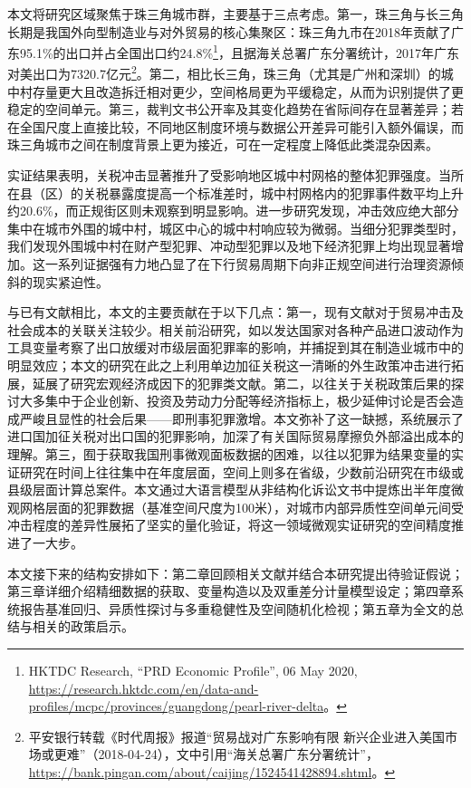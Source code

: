 \documentclass[a4paper,12pt]{report}
\begin{document}
本文将研究区域聚焦于珠三角城市群，主要基于三点考虑。第一，珠三角与长三角长期是我国外向型制造业与对外贸易的核心集聚区：珠三角九市在2018年贡献了广东95.1\%的出口并占全国出口约24.8\%\footnote{HKTDC Research, ``PRD Economic Profile'', 06 May 2020, \url{https://research.hktdc.com/en/data-and-profiles/mcpc/provinces/guangdong/pearl-river-delta}。}，且据海关总署广东分署统计，2017年广东对美出口为7320.7亿元\footnote{平安银行转载《时代周报》报道“贸易战对广东影响有限 新兴企业进入美国市场或更难”（2018-04-24），文中引用“海关总署广东分署统计”，\url{https://bank.pingan.com/about/caijing/1524541428894.shtml}。}。第二，相比长三角，珠三角（尤其是广州和深圳）的城中村存量更大且改造拆迁相对更少，空间格局更为平缓稳定\citep{yan2022transition}，从而为识别提供了更稳定的空间单元。第三，裁判文书公开率及其变化趋势在省际间存在显著差异\citep{tang2018open,machao2016report}；若在全国尺度上直接比较，不同地区制度环境与数据公开差异可能引入额外偏误，而珠三角城市之间在制度背景上更为接近，可在一定程度上降低此类混杂因素。

实证结果表明，关税冲击显著推升了受影响地区城中村网格的整体犯罪强度。当所在县（区）的关税暴露度提高一个标准差时，城中村网格内的犯罪事件数平均上升约20.6\%，而正规街区则未观察到明显影响。进一步研究发现，冲击效应绝大部分集中在城市外围的城中村，城区中心的城中村响应较为微弱。当细分犯罪类型时，我们发现外围城中村在财产型犯罪、冲动型犯罪以及地下经济犯罪上均出现显著增加。这一系列证据强有力地凸显了在下行贸易周期下向非正规空间进行治理资源倾斜的现实紧迫性。

与已有文献相比，本文的主要贡献在于以下几点：第一，现有文献对于贸易冲击及社会成本的关联关注较少。相关前沿研究，如\textcite{ma2025export}以发达国家对各种产品进口波动作为工具变量考察了出口放缓对市级层面犯罪率的影响，并捕捉到其在制造业城市中的明显效应；本文的研究在此之上利用单边加征关税这一清晰的外生政策冲击进行拓展，延展了研究宏观经济成因下的犯罪类文献。第二，以往关于关税政策后果的探讨大多集中于企业创新、投资及劳动力分配等经济指标上\citep{ma2025market}，极少延伸讨论是否会造成严峻且显性的社会后果——即刑事犯罪激增。本文弥补了这一缺撼，系统展示了进口国加征关税对出口国的犯罪影响，加深了有关国际贸易摩擦负外部溢出成本的理解。第三，囿于获取我国刑事微观面板数据的困难，以往以犯罪为结果变量的实证研究在时间上往往集中在年度层面，空间上则多在省级，少数前沿研究在市级或县级层面计算总案件。本文通过大语言模型从非结构化诉讼文书中提炼出半年度微观网格层面的犯罪数据（基准空间尺度为100米），对城市内部异质性空间单元间受冲击程度的差异性展拓了坚实的量化验证，将这一领域微观实证研究的空间精度推进了一大步。

本文接下来的结构安排如下：第二章回顾相关文献并结合本研究提出待验证假说；第三章详细介绍精细数据的获取、变量构造以及双重差分计量模型设定；第四章系统报告基准回归、异质性探讨与多重稳健性及空间随机化检视；第五章为全文的总结与相关的政策启示。
\end{document}
